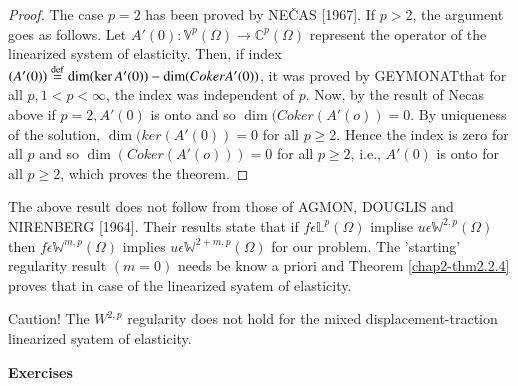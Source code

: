 \begin{proof}
  The case $p=2$ has been proved by NE\v{C}AS [1967]. If $p > 2$, the
  argument goes as follows. Let $A'(0):\mathbb{V}^p(\Omega)\to
  \mathbb{C}^p (\Omega)$ represent the operator of the linearized
  system of elasticity. Then, if index $(A' (0))\overset{\operatorname{def}}{=}\dim
  (\ker A' (0))-\dim (Coker A' (0))$, it was proved by GEYMONAT\pageoriginale
  [1965] that for all $p, 1< p< \infty $, the index was independent
  of $p$. Now, by the result of Necas above if $p=2, A'(0)$ is onto
  and so $\dim (Coker (A'(o)) = 0$. By uniqueness of the solution,
  $\dim (ker (A'(0))=0$ for all $ p \ge 2$. Hence the index is zero
  for all $p$ and so $\dim (Coker(A'(o)))=0$ for all $p \ge 2$,
  i.e., $A'(0)$ is onto for all $p \ge 2$, which proves the theorem. 
\end{proof}

\begin{remark}\label{chap2-rem2.2.3}%
  The above result does not follow from those of AGMON, DOUGLIS and
  NIRENBERG [1964]. Their results state that if $f \epsilon
  \mathbb{L}^p(\Omega)$ implise $u\epsilon\mathbb{W}^{2,p}(\Omega)$
  then $f \epsilon \mathbb{W}^{m,p}(\Omega)$ implies $u
  \epsilon\mathbb{W}^{2+m,p}(\Omega)$ for our problem. The
  'starting' regularity result $(m=0)$ needs be know a priori and
  Theorem \ref{chap2-thm2.2.4} proves that in case of the linearized
  syatem of elasticity. 
\end{remark}

Caution! The $W^{2,p}$ regularity does not hold for the mixed
displace\-ment-traction linearized syatem of elasticity. 

\medskip
\begin{center}
{\large\bf Exercises}
\end{center}

